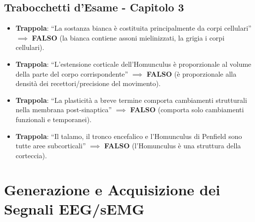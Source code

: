 \documentclass[10pt, letterpaper]{report}
\begin{document}
\section*{Trabocchetti d'Esame - Capitolo 3}
\begin{itemize}
    \item \textbf{Trappola}: ``La sostanza bianca è costituita principalmente da corpi cellulari'' \(\implies\) \textbf{FALSO} (la bianca contiene assoni mielinizzati, la grigia i corpi cellulari).
    \item \textbf{Trappola}: ``L'estensione corticale dell'Homunculus è proporzionale al volume della parte del corpo corrispondente'' \(\implies\) \textbf{FALSO} (è proporzionale alla densità dei recettori/precisione del movimento).
    \item \textbf{Trappola}: ``La plasticità a breve termine comporta cambiamenti strutturali nella membrana post-sinaptica'' \(\implies\) \textbf{FALSO} (comporta solo cambiamenti funzionali e temporanei).
    \item \textbf{Trappola}: ``Il talamo, il tronco encefalico e l'Homunculus di Penfield sono tutte aree subcorticali'' \(\implies\) \textbf{FALSO} (l'Homunculus è una struttura della corteccia).
\end{itemize}

\chapter{Generazione e Acquisizione dei Segnali EEG/sEMG}
\end{document}

